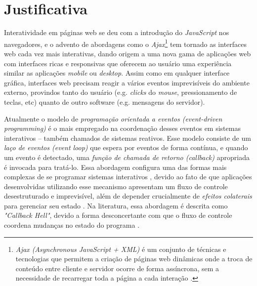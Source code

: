 \section{Justificativa}\label{ljustificativa}

Interatividade em páginas web se deu com a
introdução do \emph{JavaScript} nos navegadores,
e o advento de abordagens como o \emph{Ajax}\footnote{
  \emph{Ajax (Asynchronous JavaScript + XML)} é um
  conjunto de técnicas e tecnologias que permitem a
  criação de páginas web dinâmicas onde a troca de
  conteúdo entre cliente e servidor ocorre de forma
  assíncrona, sem a necessidade de recarregar toda
  a página a cada interação \cite{garrett2005ajax}.
}
tem tornado as interfaces web cada vez mais interativas,
dando origem a uma nova gama de aplicações web com interfaces
ricas e responsivas que oferecem ao usuário uma experiência
similar as aplicações \textit{mobile} ou \textit{desktop}.
Assim como em qualquer interface gráfica, interfaces web
precisam reagir a vários eventos imprevisíveis do ambiente
externo, provindos tanto do usuário (e.g. \textit{clicks}
do \textit{mouse}, pressionamento de teclas, etc)
quanto de outro software (e.g. mensagens do servidor).

Atualmente o modelo de \emph{programação orientada a eventos
(event-driven programming)} é o mais empregado na
coordenação desses eventos em sistemas interativos
-- também chamados de sistemas reativos.
Esse modelo consiste de um \emph{laço de eventos (event loop)} que espera por
eventos de forma contínua, e quando um evento é detectado,
uma \emph{função de chamada de retorno (callback)}
apropriada é invocada para tratá-lo.
Essa abordagem configura uma das formas mais complexas de se
programar sistemas interativos \cite{
  edwards2009coherent,
  maier2010deprecating,
  reppy1992higher},
devido ao fato de que aplicações desenvolvidas utilizando
esse mecanismo apresentam um fluxo de controle desestruturado
e imprevisível, além de depender crucialmente de
\textit{efeitos colaterais\footnotemark} para
gerenciar seu estado \cite{
  meyerovich2009flapjax,
  muller2015interactive,
  muller2015practical}.
Na literatura, essa abordagem é descrita como \textit{"Callback Hell"},
devido a forma desconcertante com que o fluxo de controle coordena
mudanças no estado do programa \cite[p.~2]{edwards2009coherent}.

